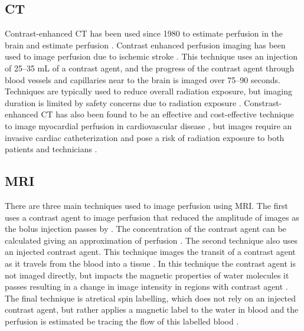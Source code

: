 \subsection{CT}

Contrast-enhanced CT has been used since 1980 to estimate perfusion in the brain 
and estimate perfusion \parencite{axel_cerebral_1980}. Contrast enhanced perfusion imaging 
has been used to image perfusion due to ischemic stroke 
\parencite{miles_colour_1991,koenig_perfusion_1998}.
This technique uses an injection of 25--35 mL 
of a contrast agent, and the progress of the contrast agent through blood vessels 
and capillaries near to the brain is imaged over  75--90 seconds. Techniques are typically used to reduce overall 
radiation exposure, but imaging duration is limited by safety concerns due to radiation exposure
\parencite{konstas_theoretic_2009}.
Constrast-enhanced CT has also been found to be an effective and cost-effective 
technique to image myocardial perfusion in cardiovascular disease
\parencite{aljizeeri_ct_2013}, but images require an invasive cardiac catheterization and 
pose a risk of radiation exposure to 
both patients and technicians \parencite{vijayalakshmi_cardiac_2007}.

\subsection{MRI}

There are three main techniques used to image perfusion using 
MRI. The first uses a contrast agent to image perfusion that reduced the amplitude of  
images as the bolus injection passes by \parencite{jackson_dynamic_2005}.  
The concentration of the contrast agent 
can be calculated giving 
an approximation of 
perfusion \parencite{jackson_dynamic_2005}. 
The second technique also uses an injected contrast
agent. This technique images the transit of a contrast agent as it travels 
from the blood into a tissue \parencite{sourbron_classic_2013}. In this technique the contrast
agent is not imaged directly, but impacts the magnetic properties of 
water molecules it passes resulting in a change in image intensity in regions 
with contrast agent \parencite{sourbron_classic_2013}. 
The final technique is atretical spin labelling, which does not rely on 
an injected contrast agent, but rather applies a  magnetic label to the water 
in blood and the perfusion is estimated be tracing the flow of this labelled 
blood \parencite{koretsky_early_2012}. 

